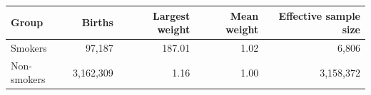 {\small
\begin{tabular}{lrrrr}
\toprule
Group & Births & Largest weight & Mean weight & Effective sample size \\
\midrule
Smokers & 97,187 & 187.01 & 1.02 & 6,806 \\
Non-smokers & 3,162,309 & 1.16 & 1.00 & 3,158,372 \\
\bottomrule
\end{tabular}
}
